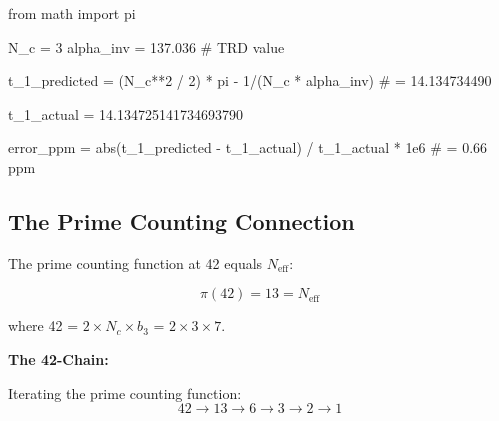 \documentclass[
  11pt,
  letterpaper,
  twoside,
  openright]{book}
\newenvironment{Shaded}{\begin{snugshade}}{\end{snugshade}}
\newcommand{\BuiltInTok}[1]{\textcolor[rgb]{0.00,0.23,0.31}{#1}}
\newcommand{\CommentTok}[1]{\textcolor[rgb]{0.37,0.37,0.37}{#1}}
\newcommand{\DecValTok}[1]{\textcolor[rgb]{0.68,0.00,0.00}{#1}}
\newcommand{\FloatTok}[1]{\textcolor[rgb]{0.68,0.00,0.00}{#1}}
\newcommand{\ImportTok}[1]{\textcolor[rgb]{0.00,0.46,0.62}{#1}}
\newcommand{\NormalTok}[1]{\textcolor[rgb]{0.00,0.23,0.31}{#1}}
\newcommand{\OperatorTok}[1]{\textcolor[rgb]{0.37,0.37,0.37}{#1}}
\begin{document}
\begin{tcolorbox}[enhanced jigsaw, coltitle=black, colbacktitle=quarto-callout-note-color!10!white, toprule=.15mm, colframe=quarto-callout-note-color-frame, arc=.35mm, opacityback=0, bottomtitle=1mm, toptitle=1mm, breakable, colback=white, titlerule=0mm, opacitybacktitle=0.6, title=\textcolor{quarto-callout-note-color}{\faInfo}\hspace{0.5em}{Python Verification}, rightrule=.15mm, bottomrule=.15mm, leftrule=.75mm, left=2mm]

\begin{Shaded}
\begin{Highlighting}[]
\ImportTok{from}\NormalTok{ math }\ImportTok{import}\NormalTok{ pi}

\NormalTok{N\_c }\OperatorTok{=} \DecValTok{3}
\NormalTok{alpha\_inv }\OperatorTok{=} \FloatTok{137.036}  \CommentTok{\# TRD value}

\NormalTok{t\_1\_predicted }\OperatorTok{=}\NormalTok{ (N\_c}\OperatorTok{**}\DecValTok{2} \OperatorTok{/} \DecValTok{2}\NormalTok{) }\OperatorTok{*}\NormalTok{ pi }\OperatorTok{{-}} \DecValTok{1}\OperatorTok{/}\NormalTok{(N\_c }\OperatorTok{*}\NormalTok{ alpha\_inv)}
\CommentTok{\# = 14.134734490}

\NormalTok{t\_1\_actual }\OperatorTok{=} \FloatTok{14.134725141734693790}

\NormalTok{error\_ppm }\OperatorTok{=} \BuiltInTok{abs}\NormalTok{(t\_1\_predicted }\OperatorTok{{-}}\NormalTok{ t\_1\_actual) }\OperatorTok{/}\NormalTok{ t\_1\_actual }\OperatorTok{*} \FloatTok{1e6}
\CommentTok{\# = 0.66 ppm}
\end{Highlighting}
\end{Shaded}

\end{tcolorbox}

\subsection{The Prime Counting
Connection}\label{the-prime-counting-connection}

The prime counting function at 42 equals \(N_{\text{eff}}\):

\[\pi(42) = 13 = N_{\text{eff}}\]

where 42 = \(2 \times N_c \times b_3\) = \(2 \times 3 \times 7\).

\textbf{The 42-Chain:}

Iterating the prime counting function:
\[42 \to 13 \to 6 \to 3 \to 2 \to 1\]
\end{document}
